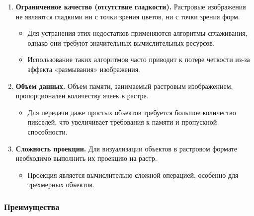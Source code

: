\begin{enumerate}[label=\textbf{\arabic*.}, leftmargin=1.5em]

    \item \textbf{Ограниченное качество (отсутствие гладкости).}
          Растровые изображения не являются гладкими ни с точки зрения цветов, ни с точки зрения форм.
          \begin{itemize}
              \item Для устранения этих недостатков применяются алгоритмы сглаживания, однако они требуют значительных вычислительных ресурсов.
              \item Использование таких алгоритмов часто приводит к потере четкости из-за эффекта «размывания» изображения.
          \end{itemize}

    \item \textbf{Объем данных.}
          Объем памяти, занимаемый растровым изображением, пропорционален количеству ячеек в растре.
          \begin{itemize}
              \item Для передачи даже простых объектов требуется большое количество пикселей, что увеличивает требования к памяти и пропускной способности.
          \end{itemize}

    \item \textbf{Сложность проекции.}
          Для визуализации объектов в растровом формате необходимо выполнить их проекцию на растр.
          \begin{itemize}
              \item Проекция является вычислительно сложной операцией, особенно для трехмерных объектов.
          \end{itemize}

\end{enumerate}

\subsubsection*{Преимущества}

